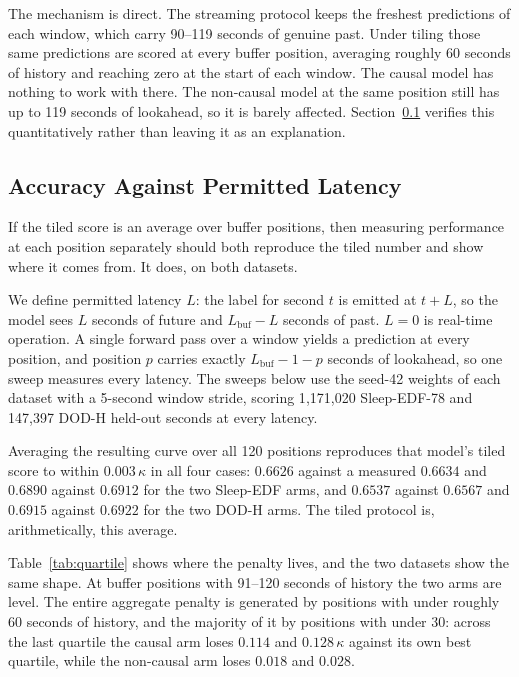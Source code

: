 \documentclass[conference]{IEEEtran}
\begin{document}
The mechanism is direct. The streaming protocol keeps the freshest predictions of each window,
which carry 90--119 seconds of genuine past. Under tiling those same predictions are scored at every
buffer position, averaging roughly 60 seconds of history and reaching zero at the start of each
window. The causal model has nothing to work with there. The non-causal model at the same position
still has up to 119 seconds of lookahead, so it is barely affected.
Section~\ref{sec:latency} verifies this quantitatively rather than leaving it as an explanation.

\subsection{Accuracy Against Permitted Latency}
\label{sec:latency}

If the tiled score is an average over buffer positions, then measuring performance at each position
separately should both reproduce the tiled number and show where it comes from. It does, on both
datasets.

We define permitted latency $L$: the label for second $t$ is emitted at $t + L$, so the model sees
$L$ seconds of future and $L_{\text{buf}} - L$ seconds of past. $L = 0$ is real-time operation. A
single forward pass over a window yields a prediction at every position, and position $p$ carries
exactly $L_{\text{buf}} - 1 - p$ seconds of lookahead, so one sweep measures every latency. The
sweeps below use the seed-42 weights of each dataset with a 5-second window stride, scoring 1{,}171{,}020
Sleep-EDF-78 and 147{,}397 DOD-H held-out seconds at every latency.

Averaging the resulting curve over all 120 positions reproduces that model's tiled score to within
$0.003\,\kappa$ in all four cases: $0.6626$ against a measured $0.6634$ and $0.6890$ against
$0.6912$ for the two Sleep-EDF arms, and $0.6537$ against $0.6567$ and $0.6915$ against $0.6922$ for
the two DOD-H arms. The tiled protocol is, arithmetically, this average.

Table~\ref{tab:quartile} shows where the penalty lives, and the two datasets show the same shape.
At buffer positions with 91--120 seconds of history the two arms are level. The entire aggregate
penalty is generated by positions with under roughly 60 seconds of history, and the majority of it
by positions with under 30: across the last quartile the causal arm loses $0.114$ and $0.128\,\kappa$
against its own best quartile, while the non-causal arm loses $0.018$ and $0.028$.
\end{document}
